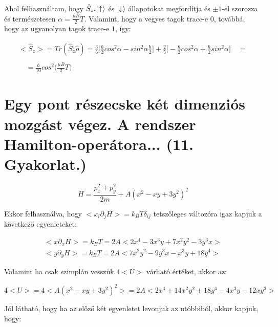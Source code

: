 \documentclass[a4paper,12pt]{article}
\begin{document}
\par Ahol felhasználtam, hogy $\hat{S}_{z}, \ket{\uparrow}$ és $\ket{\downarrow}$ állapotokat megfordítja és $\pm1$-el szorozza és természetesen $\alpha = \frac{\mu B}{2}T$. Valamint, hogy a vegyes tagok trace-e $0$, továbbá, hogy az ugyanolyan tagok trace-e $1$, így:

\begin{equation}
\begin{gathered}
<\hat{S}_{z}> = Tr(\hat{S}_{z}\hat{\rho}) = \frac{3}{5}\Big[ \frac{\hbar}{2}cos^{2}\alpha - sin^{2}\alpha \frac{\hbar}{2} \Big] + \frac{2}{5}\Big[ -\frac{\hbar}{2}cos^{2}\alpha + \frac{\hbar}{2}sin^{2}\alpha\Big] \quad = \\ \\
\quad =  \frac{\hbar}{10}cos^{2}\Big(\frac{\mu B}{2}T\Big)
\end{gathered}
\end{equation}

\section{Egy pont részecske két dimenziós mozgást végez. A rendszer Hamilton-operátora... (11. Gyakorlat.)}

\begin{equation*}
H = \frac{p^{2}_{x}+p_{y}^{2}}{2m} + A(x^{2} -xy + 3y^{2})^{2}
\end{equation*}

\par Ekkor felhasználva, hogy $<x_{i}\partial_{j}H> = k_{B}T\delta_{ij}$ tetszőleges változóra igaz kapjuk a következő egyenleteket:

\begin{equation*}
\begin{gathered}
<x\partial_{x}H> = k_{B}T = 2A<2x^{4} - 3x^{3}y + 7x^{2}y^{2} - 3y^{3}x> \\
<y\partial_{y}H> = k_{B}T = 2A<7x^{2}y^{2} - 9y^{3}x - x^{3}y + 18y^{4}>
\end{gathered}
\end{equation*}
 
\par Valamint ha csak szimplán vesszük $4<U>$ várható értéket, akkor az:

\begin{equation*}
4<U> = 4<A(x^{2} -xy + 3y^{2})^{2}> = 2A<2x^{4} + 14x^{2}y^{2}+18y^{4}-4x^{3}y-12xy^{3}>
\end{equation*}

\par Jól látható, hogy ha az előző két egyenletet levonjuk az utóbbiból, akkor kapjuk, hogy:
\end{document}
